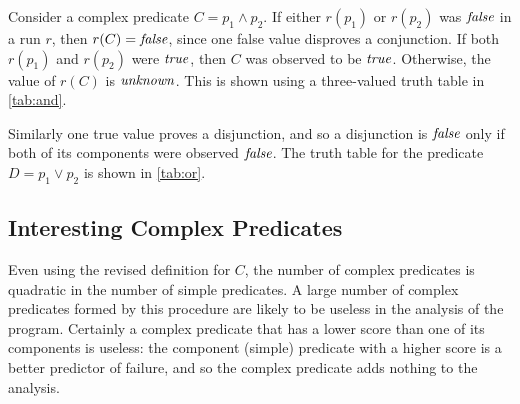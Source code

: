 Consider a complex predicate $C = p_1 \wedge p_2$.  If either $r(p_1)$ or $r(p_2)$ was $\mathit{false}$ in a run $r$, then $r(C) = \mathit{false}$, since one false value disproves a conjunction.  If both $r(p_1)$ and $r(p_2)$ were $\mathit{true}$, then $C$ was observed to be $\mathit{true}$.  Otherwise, the value of $r(C)$ is $\mathit{unknown}$. This is shown using a three-valued truth table in \autoref{tab:and}.

Similarly one true value proves a disjunction, and so a disjunction is $\mathit{false}$ only if both of its components were observed $\mathit{false}$.  The truth table for the predicate $D = p_1 \vee p_2$ is shown in \autoref{tab:or}.

\begin{table}[tb]
  \caption{Three-valued truth tables for complex predicates}
  \label{tab:truth-tables}
  \hfill
  \hfill
  \hspace*{\fill}
\end{table}

\subsection{Interesting Complex Predicates}
Even using the revised definition for $C$, the number of complex predicates is quadratic in the number of simple predicates.  A large number of complex predicates formed by this procedure are likely to be useless in the analysis of the program.  Certainly a complex predicate that has a lower score than one of its components is useless: the component (simple) predicate with a higher score is a better predictor of failure, and so the complex predicate adds nothing to the analysis.

